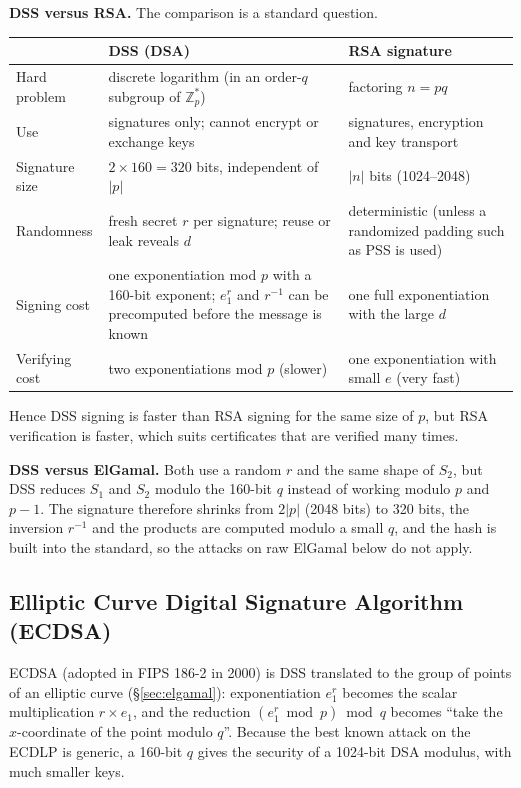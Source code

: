 \textbf{DSS versus RSA.} The comparison is a standard question.
\begin{center}\small
\begin{tabularx}{\textwidth}{@{}l X X@{}}
\toprule
 & DSS (DSA) & RSA signature\\
\midrule
Hard problem & discrete logarithm (in an order-$q$ subgroup of $\mathbb{Z}_p^*$) & factoring $n = pq$\\
Use & signatures only; cannot encrypt or exchange keys & signatures, encryption and key transport\\
Signature size & $2 \times 160 = 320$ bits, independent of $|p|$ & $|n|$ bits (1024--2048)\\
Randomness & fresh secret $r$ per signature; reuse or leak reveals $d$ & deterministic (unless a randomized padding such as PSS is used)\\
Signing cost & one exponentiation mod $p$ with a 160-bit exponent; $e_1^r$ and $r^{-1}$ can be precomputed before the message is known & one full exponentiation with the large $d$\\
Verifying cost & two exponentiations mod $p$ (slower) & one exponentiation with small $e$ (very fast)\\
\bottomrule
\end{tabularx}
\end{center}
Hence DSS signing is faster than RSA signing for the same size of $p$, but RSA verification is faster, which suits certificates that are verified many times.

\textbf{DSS versus ElGamal.} Both use a random $r$ and the same shape of $S_2$, but DSS reduces $S_1$ and $S_2$ modulo the 160-bit $q$ instead of working modulo $p$ and $p - 1$. The signature therefore shrinks from $2|p|$ (2048 bits) to 320 bits, the inversion $r^{-1}$ and the products are computed modulo a small $q$, and the hash is built into the standard, so the attacks on raw ElGamal below do not apply.

\subsection{Elliptic Curve Digital Signature Algorithm (ECDSA) \new}

ECDSA (adopted in FIPS 186-2 in 2000) is DSS translated to the group of points of an elliptic curve (\S\ref{sec:elgamal}): exponentiation $e_1^r$ becomes the scalar multiplication $r \times e_1$, and the reduction $(e_1^r \bmod p) \bmod q$ becomes ``take the $x$-coordinate of the point modulo $q$''. Because the best known attack on the ECDLP is generic, a 160-bit $q$ gives the security of a 1024-bit DSA modulus, with much smaller keys.

